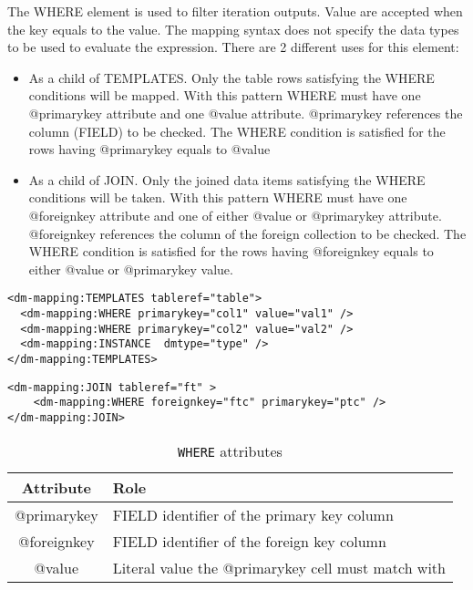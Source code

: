 The WHERE element is used to filter iteration outputs. Value are accepted when the key equals to the value. The mapping syntax does not specify the data types to be used to evaluate the expression. 
There  are 2 different uses for this element:
\begin{itemize}
    \item As a child of TEMPLATES. Only the table rows satisfying the WHERE conditions will be mapped. 
             With this pattern WHERE must have one @primarykey attribute and one @value attribute. 
              @primarykey references the column (FIELD) to be checked. 
             The WHERE condition is satisfied for the rows having @primarykey equals to @value
    \item As a child of JOIN. Only the joined data items satisfying the WHERE conditions will be taken. 
             With this pattern WHERE must have one @foreignkey attribute and one of either @value or @primarykey attribute. 
              @foreignkey references the column of the foreign collection to be checked. 
             The WHERE condition is satisfied for the rows having @foreignkey equals to either @value or @primarykey value.
\end{itemize}
\begin{lstlisting}[frame=single,caption={\texttt{WHERE} Example: only rows having val1 as col1 value and  val2 as col2 value are mapped},style=XML,basicstyle=\tiny]
<dm-mapping:TEMPLATES tableref="table">
  <dm-mapping:WHERE primarykey="col1" value="val1" />
  <dm-mapping:WHERE primarykey="col2" value="val2" />
  <dm-mapping:INSTANCE  dmtype="type" />
</dm-mapping:TEMPLATES>
\end{lstlisting}

\begin{lstlisting}[frame=single,caption={\texttt{WHERE} Example: the join is satisfied when the value of the ptc column  is equals to the ftc column of the foreign table },style=XML,basicstyle=\tiny]
<dm-mapping:JOIN tableref="ft" >
	<dm-mapping:WHERE foreignkey="ftc" primarykey="ptc" />
</dm-mapping:JOIN>
\end{lstlisting}

\begin{table}[!htbp]
\small
\centering
\begin{tabulary}{\linewidth}{|c|J|}       
       \hline 
            \textbf{Attribute} & 
            \textbf {Role}\\
       \hline         \hline  
            @primarykey& 
            FIELD identifier of the primary key column \\
        \hline 
            @foreignkey & 
            FIELD identifier of the foreign key column \\
        \hline 
            @value & 
            Literal value the  @primarykey cell must match with\\
        \hline 
     \end{tabulary}
     \caption{\texttt{WHERE} attributes} 
     \label{tbl:where-att}
 \end{table}

